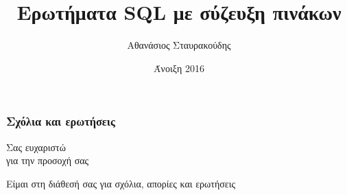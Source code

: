 \documentclass[xcolor=dvipsnames, aspectratio=149, 12pt]{beamer}
\begin{document}
\author[]{Αθανάσιος Σταυρακούδης}
\title[]{Ερωτήματα {\en SQL} με σύζευξη πινάκων}
\date[]{Άνοιξη 2016}


\el
\titlepage








\begin{frame}
\frametitle{Σχόλια και ερωτήσεις}
\par {\Huge \color{red} Σας ευχαριστώ \\ για την προσοχή σας }
\vspace{1cm}
\par Είμαι στη διάθεσή σας για σχόλια, απορίες και ερωτήσεις
\end{frame}
\end{document}
